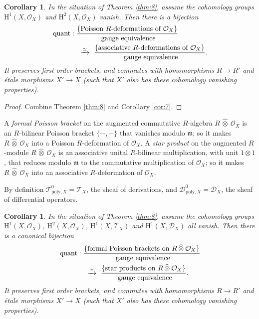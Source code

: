 \documentclass[a4paper, 10pt]{amsart}
\newtheorem{cor}[equation]{Corollary}
\theoremstyle{definition}
\numberwithin{equation}{section}
\newcommand{\iso}{\xrightarrow{\simeq}}
\newcommand{\opn}{\operatorname}
\newcommand{\mfrak}[1]{\mathfrak{#1}}
\newcommand{\mcal}[1]{\mathcal{#1}}
\newcommand{\mrm}[1]{\mathrm{#1}}
\newcommand{\tup}[1]{\textup{#1}}
\newcommand{\ot}{\otimes}
\newcommand{\hatotimes}[1]{\, \what{{\otimes}}_{#1} \,}
\newcommand{\hot}{\hatotimes{}}
\newcommand{\what}[1]{\widehat{#1}}
\newcommand{\m}{\mfrak{m}}
\newcommand{\OX}{\mcal{O}_X}
\begin{document}
\begin{cor} \label{cor:TDQ.105}
In the situation of Theorem \tup{\ref{thm:8}}, 
assume the cohomology groups 
$\mrm{H}^1(X, \mcal{O}_X)$ and $\mrm{H}^2(X, \mcal{O}_X)$ vanish. 
Then there is a bijection
\[ \begin{aligned}
& \opn{quant} : 
\frac{ \{ \tup{Poisson $R$-deformations of $\mcal{O}_X$} \} }
{\tup{ gauge equivalence}} \\
& \hspace{9ex} \iso \
\frac{ \{ \tup{associative $R$-deformations of $\mcal{O}_X$} \} }
{\tup{ gauge equivalence}} . 
\end{aligned} \] 
It preserves first order brackets, and commutes with
homomorphisms $R \to R'$ and  \'etale morphisms $X' \to X$
\tup{(}such that $X'$ also has these cohomology vanishing properties\tup{)}.
\end{cor}

\begin{proof}
Combine Theorem \ref{thm:8} and Corollary \ref{cor:7}.
\end{proof}

A {\em formal Poisson bracket} on the augmented commutative $R$-algebra 
$R \hot \OX$ is an $R$-bilinear Poisson bracket $\{ -,- \}$ that vanishes modulo
$\m$; so it makes $R \hot \OX$ into a Poisson $R$-deformation of $\OX$. 
A {\em star product} on the augmented $R$-module $R \hot \OX$ is an 
associative unital $R$-bilinear multiplication, with unit 
$1 \ot 1$, that reduces modulo $\m$ to the commutative multiplication of $\OX$;
so it makes $R \hot \OX$ into an associative $R$-deformation of $\OX$. 

By definition 
$\mcal{T}^0_{\mrm{poly},X} = \mcal{T}_X$, the sheaf of derivations, and 
$\mcal{D}^{0}_{\mrm{poly},X} = \mcal{D}_X$, the sheaf of differential operators.

\begin{cor} \label{cor:TDQ.102}
In the situation of Theorem \tup{\ref{thm:8}}, 
assume the cohomology groups 
$\mrm{H}^1(X, \mcal{O}_X)$, $\mrm{H}^2(X, \mcal{O}_X)$, 
$\mrm{H}^1(X, \mcal{T}_X)$ and $\mrm{H}^1(X, \mcal{D}_X)$
all vanish. Then there is a canonical bijection
\[ \begin{aligned}
& \opn{quant} : 
\frac{ \{ \tup{formal Poisson brackets on $R \hot \mcal{O}_X$} \} }
{\tup{ gauge equivalence}} \\
& \hspace{9ex} \iso \
\frac{ \{ \tup{star products on $R \hot \mcal{O}_X$} \} }
{\tup{ gauge equivalence}} . 
\end{aligned} \] 
It preserves first order brackets, and commutes with
homomorphisms $R \to R'$ and  \'etale morphisms $X' \to X$ 
\tup{(}such that $X'$ also has these cohomology vanishing properties\tup{)}.
\end{cor}
\end{document}
